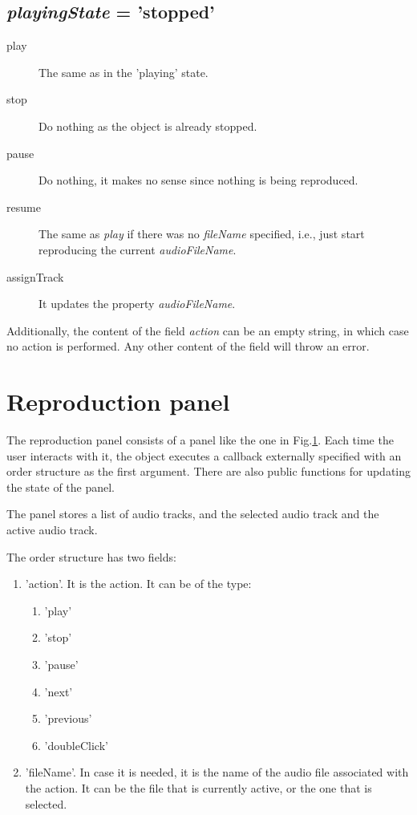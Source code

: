 \subsection*{\textit{playingState} = 'stopped'}
\begin{description}
	\item[play] The same as in the 'playing' state.
	\item[stop] Do nothing as the object is already stopped.
	\item[pause] Do nothing, it makes no sense since nothing is being reproduced.
	\item[resume] The same as \textit{play} if there was no \textit{fileName} specified, i.e., just start reproducing the current \textit{audioFileName}.
	\item[assignTrack] It updates the property \textit{audioFileName}.
\end{description}

Additionally, the content of the field \textit{action} can be an empty string, in which case no action is performed. Any other content of the field will throw an error.

\section{Reproduction panel}
The reproduction panel consists of a panel like the one in Fig.\ref{}. Each time the user interacts with it, the object executes a callback externally specified with an order structure as the first argument. There are also public functions for updating the state of the panel.

The panel stores a list of audio tracks, and the selected audio track and the active audio track.

The order structure has two fields:
\begin{enumerate}
	\item 'action'. It is the action. It can be of the type:
	\begin{enumerate}
		\item 'play'
		\item 'stop'
		\item 'pause'
		\item 'next'
		\item 'previous'
		\item 'doubleClick'
	\end{enumerate}
	\item 'fileName'. In case it is needed, it is the name of the audio file associated with the action. It can be the file that is currently active, or the one that is selected.
\end{enumerate}